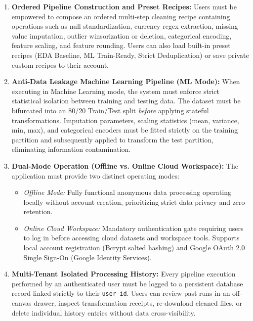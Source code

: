 \begin{enumerate}[label=\textbf{FR\arabic*.}]
\begin{itemize}
    \item \emph{Uniformity (25 pts):} Measures consistency of parsed data types across features ($25 \times (\text{valid\_typed\_cols} / \text{total\_cols})$).
    \item \emph{Row Retention (25 pts):} Evaluates sample preservation after row-dropping transformations ($25 \times (\text{final\_rows} / \text{initial\_rows})$).
  \end{itemize}
  The health module must also output actionable diagnostic warnings (e.g., high-cardinality text columns, extreme skewness).
  \item \textbf{Ordered Pipeline Construction and Preset Recipes:} Users must be empowered to compose an ordered multi-step cleaning recipe containing operations such as null standardization, currency regex extraction, missing value imputation, outlier winsorization or deletion, categorical encoding, feature scaling, and feature rounding. Users can also load built-in preset recipes (EDA Baseline, ML Train-Ready, Strict Deduplication) or save private custom recipes to their account.
  \item \textbf{Anti-Data Leakage Machine Learning Pipeline (ML Mode):} When executing in Machine Learning mode, the system must enforce strict statistical isolation between training and testing data. The dataset must be bifurcated into an 80/20 Train/Test split \emph{before} applying stateful transformations. Imputation parameters, scaling statistics (mean, variance, min, max), and categorical encoders must be fitted strictly on the training partition and subsequently applied to transform the test partition, eliminating information contamination.
  \item \textbf{Dual-Mode Operation (Offline vs. Online Cloud Workspace):} The application must provide two distinct operating modes:
  \begin{itemize}
    \item \emph{Offline Mode:} Fully functional anonymous data processing operating locally without account creation, prioritizing strict data privacy and zero retention.
    \item \emph{Online Cloud Workspace:} Mandatory authentication gate requiring users to log in before accessing cloud datasets and workspace tools. Supports local account registration (Bcrypt salted hashing) and Google OAuth 2.0 Single Sign-On (Google Identity Services).
  \end{itemize}
  \item \textbf{Multi-Tenant Isolated Processing History:} Every pipeline execution performed by an authenticated user must be logged to a persistent database record linked strictly to their \texttt{user\_id}. Users can review past runs in an off-canvas drawer, inspect transformation receipts, re-download cleaned files, or delete individual history entries without data cross-visibility.

\end{enumerate}
